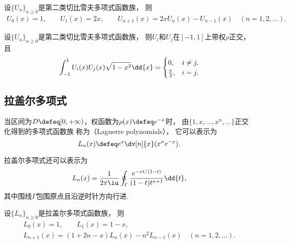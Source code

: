 \begin{property}
设\(\{U_n\}_{n\geq0}\)是第二类切比雪夫多项式函数族，
则\begin{gather}
	U_0(x) = 1,
	\qquad
	U_1(x) = 2x,
	\qquad
	U_{n+1}(x) = 2x U_n(x) - U_{n-1}(x)
	\quad(n=1,2,\dotsc).
\end{gather}
\end{property}

\begin{property}
设\(\{U_n\}_{n\geq0}\)是第二类切比雪夫多项式函数族，
则\(U_i\)和\(U_j\)在\([-1,1]\)上带权\(\rho\)正交，
且\begin{equation}
	\def\arraystretch{1.5}
	\int_{-1}^1 U_i(x) U_j(x) \sqrt{1-x^2} \dd{x}
	= \begin{cases}
		0, & i \neq j, \\
		\frac\pi2, & i = j.
	\end{cases}
\end{equation}
\end{property}

\subsection{拉盖尔多项式}
当区间为\(D \defeq [0,+\infty)\)，权函数为\(\rho(x) \defeq e^{-x}\)时，
由\(\{1,x,\dotsc,x^n,\dotsc\}\)正交化得到的多项式函数族
称为（Laguerre polynomials），
它可以表示为\begin{equation}
	L_n(x)
	\defeq
	e^x \dv[n]{x} (x^n e^{-x}).
\end{equation}

拉盖尔多项式还可以表示为\begin{equation}
	L_n(x) = \frac1{2\pi\iu} \oint_\Gamma \frac{e^{-xt/(1-t)}}{(1-t)t^{n+1}} \dd{t},
\end{equation}
其中围线\(\Gamma\)包围原点且沿逆时针方向行进.

\begin{property}
设\(\{L_n\}_{n\geq0}\)是拉盖尔多项式函数族，
则\begin{gather}
	L_0(x) = 1,
	\qquad
	L_1(x) = 1-x, \\
	L_{n+1}(x) = (1+2n-x) L_n(x) - n^2 L_{n-1}(x)
	\quad(n=1,2,\dotsc).
\end{gather}
\end{property}

